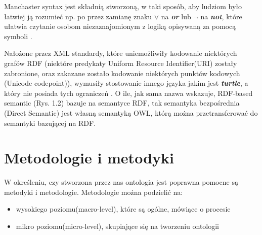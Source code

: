 \documentclass[a4paper,12pt, twoside]{book} %
\begin{document}
Manchaster syntax jest składnią stworzoną, w taki sposób, aby ludziom było łatwiej ją rozumieć np. po przez zamianę znaku $\vee$ na \textbf{\textit{or}} lub $\neg$ na \textbf{\textit{not}}, które ułatwia czytanie osobom niezaznajomionym z logiką opisywaną za pomocą symboli \cite{C.MariaKeet.2020}. %

Nałożone przez XML standardy, które uniemożliwiły kodowanie niektórych grafów RDF \cite{turt} (niektóre predykaty Uniform Resource Identifier(URI) \cite{uri} zostały zabronione, oraz zakazane zostało kodowanie niektórych punktów kodowych (Unicode codepoint)), wymusiły stostowanie innego języka jakim jest \textbf{\textit{turtle}}, a który nie posiada tych ograniczeń \cite{turt}.
O ile, jak sama nazwa wskazuje, RDF-based semantic (Rys. 1.2) bazuje na semantyce RDF, tak semantyka bezpośrednia (Direct Semantic) jest własną semantyką OWL, którą można przetransferować do semantyki bazującej na RDF. 

\section{Metodologie i metodyki}
W określeniu, czy stworzona przez nas ontologia jest poprawna pomocne są metodyki i metodologie.
Metodologie można podzielić na:
\begin{itemize}
	\item wysokiego poziomu(macro-level), które są ogólne, mówiące o procesie
	\item mikro poziomu(micro-level), skupiające się na tworzeniu ontologii
\end{itemize}
\end{document}
